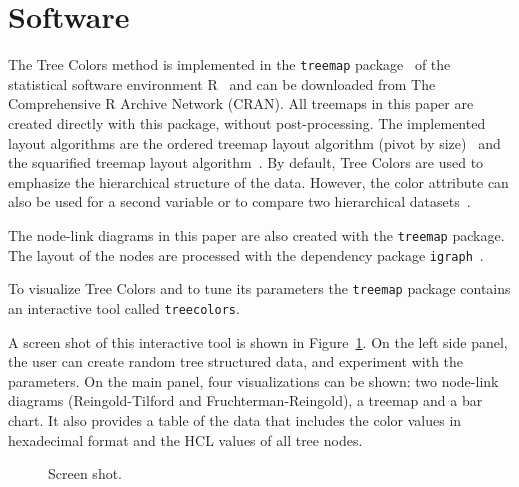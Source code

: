 \documentclass[review,journal]{vgtc}         %
\begin{document}
\section{Software}

The Tree Colors method is implemented in the \texttt{treemap} package~\cite{treemap} of the statistical software environment R~\cite{r2013} and can be downloaded from The Comprehensive R Archive Network (CRAN). All treemaps in this paper are created directly with this package, without post-processing. The implemented layout algorithms are the ordered treemap layout algorithm (pivot by size)~\cite{Bederson2002} and the squarified treemap layout algorithm~\cite{bruls99}. By default, Tree Colors are used to emphasize the hierarchical structure of the data. However, the color attribute can also be used for a second variable or to compare two hierarchical datasets~\cite{tennekes2011b}. 

The node-link diagrams in this paper are also created with the \texttt{treemap} package. The layout of the nodes are processed with the dependency package \texttt{igraph}~\cite{igraph}.

To visualize Tree Colors and to tune its parameters the \texttt{treemap} package contains an interactive tool called \texttt{treecolors}.

A screen shot of this interactive tool is shown in Figure~\ref{fig:screen}. On the left side panel, the user can create random tree structured data, and experiment with the parameters. On the main panel, four visualizations can be shown: two node-link diagrams (Reingold-Tilford and Fruchterman-Reingold), a treemap and a bar chart. It also provides a table of the data that includes the color values in hexadecimal format and the HCL values of all tree nodes.

\begin{figure}[tb]
  \centering
  \caption{Screen shot.}\label{fig:screen}
\end{figure}
\end{document}
